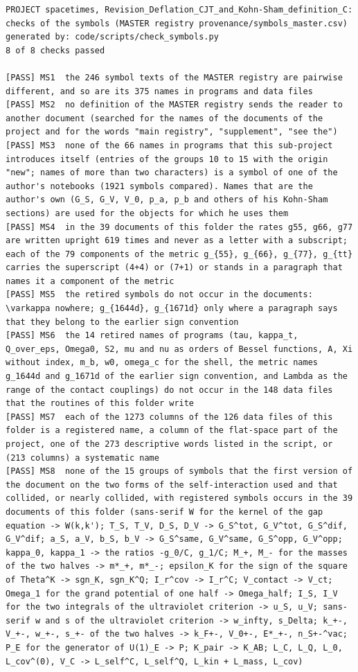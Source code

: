 \documentclass[
  10pt,
]{article}
\begin{document}
\begin{verbatim}
PROJECT spacetimes, Revision_Deflation_CJT_and_Kohn-Sham_definition_C: checks of the symbols (MASTER registry provenance/symbols_master.csv)
generated by: code/scripts/check_symbols.py
8 of 8 checks passed

[PASS] MS1  the 246 symbol texts of the MASTER registry are pairwise different, and so are its 375 names in programs and data files
[PASS] MS2  no definition of the MASTER registry sends the reader to another document (searched for the names of the documents of the project and for the words "main registry", "supplement", "see the")
[PASS] MS3  none of the 66 names in programs that this sub-project introduces itself (entries of the groups 10 to 15 with the origin "new"; names of more than two characters) is a symbol of one of the author's notebooks (1921 symbols compared). Names that are the author's own (G_S, G_V, V_0, p_a, p_b and others of his Kohn-Sham sections) are used for the objects for which he uses them
[PASS] MS4  in the 39 documents of this folder the rates g55, g66, g77 are written upright 619 times and never as a letter with a subscript; each of the 79 components of the metric g_{55}, g_{66}, g_{77}, g_{tt} carries the superscript (4+4) or (7+1) or stands in a paragraph that names it a component of the metric
[PASS] MS5  the retired symbols do not occur in the documents: \varkappa nowhere; g_{1644d}, g_{1671d} only where a paragraph says that they belong to the earlier sign convention
[PASS] MS6  the 14 retired names of programs (tau, kappa_t, Q_over_eps, Omega0, S2, mu and nu as orders of Bessel functions, A, Xi without index, m_b, w0, omega_c for the shell, the metric names g_1644d and g_1671d of the earlier sign convention, and Lambda as the range of the contact couplings) do not occur in the 148 data files that the routines of this folder write
[PASS] MS7  each of the 1273 columns of the 126 data files of this folder is a registered name, a column of the flat-space part of the project, one of the 273 descriptive words listed in the script, or (213 columns) a systematic name
[PASS] MS8  none of the 15 groups of symbols that the first version of the document on the two forms of the self-interaction used and that collided, or nearly collided, with registered symbols occurs in the 39 documents of this folder (sans-serif W for the kernel of the gap equation -> W(k,k'); T_S, T_V, D_S, D_V -> G_S^tot, G_V^tot, G_S^dif, G_V^dif; a_S, a_V, b_S, b_V -> G_S^same, G_V^same, G_S^opp, G_V^opp; kappa_0, kappa_1 -> the ratios -g_0/C, g_1/C; M_+, M_- for the masses of the two halves -> m*_+, m*_-; epsilon_K for the sign of the square of Theta^K -> sgn_K, sgn_K^Q; I_r^cov -> I_r^C; V_contact -> V_ct; Omega_1 for the grand potential of one half -> Omega_half; I_S, I_V for the two integrals of the ultraviolet criterion -> u_S, u_V; sans-serif w and s of the ultraviolet criterion -> w_infty, s_Delta; k_+-, V_+-, w_+-, s_+- of the two halves -> k_F+-, V_0+-, E*_+-, n_S+-^vac; P_E for the generator of U(1)_E -> P; K_pair -> K_AB; L_C, L_Q, L_0, L_cov^(0), V_C -> L_self^C, L_self^Q, L_kin + L_mass, L_cov)
\end{verbatim}
\end{document}
